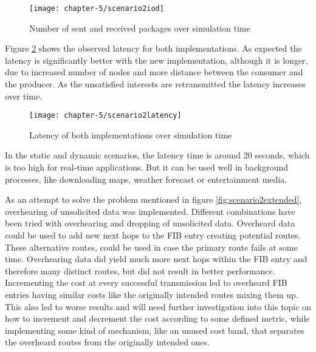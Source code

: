 \clearpage

\begin{figure}[H]
  \centering
  \texttt{[image: chapter-5/scenario2iod]}
  \caption{Number of sent and received packages over simulation time}
  \label{fig:scenario2iod}
\end{figure}

\vspace{5mm} %

Figure \ref{fig:scenario2latency} shows the observed latency for both implementations. As expected the latency is significantly better with the new implementation, although it is longer, due to increased number of nodes and more distance between the consumer and the producer. As the unsatisfied interests are retransmitted the latency increases over time.

\vspace{5mm} %

\begin{figure}[H]
  \centering
  \texttt{[image: chapter-5/scenario2latency]}
  \caption{Latency of both implementations over simulation time}
  \label{fig:scenario2latency}
\end{figure}

\vspace{5mm} %

In the static and dynamic scenarios, the latency time is around 20 seconds, which is too high for real-time applications. But it can be used well in background processes, like downloading maps, weather forecast or entertainment media.

As an attempt to solve the problem mentioned in figure \ref{fig:scenario2extended}, overhearing of unsolicited data was implemented. Different combinations have been tried with overhearing and dropping of unsolicited data. Overheard data could be used to add new next hops to the FIB entry creating potential routes. These alternative routes, could be used in case the primary route fails at some time. Overhearing data did yield much more next hops within the FIB entry and therefore many distinct routes, but did not result in better performance. Incrementing the cost at every successful transmission led to overheard FIB entries having similar costs like the originally intended routes mixing them up. This also led to worse results and will need further investigation into this topic on how to increment and decrement the cost according to some defined metric, while implementing some kind of mechanism, like an unused cost band, that separates the overheard routes from the originally intended ones.


